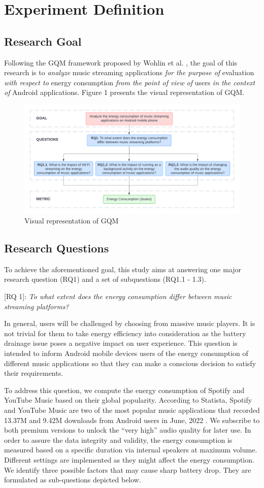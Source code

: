 \section{Experiment Definition}
\subsection{Research Goal}
Following the GQM framework proposed by Wohlin et al. \cite{wohlin2012experimentation}, the goal of this research is to \emph{analyze} music streaming applications \emph{for the purpose of} evaluation \emph{with respect to} energy consumption \emph{from the point of view of} users \emph{in the context of} Android applications. Figure 1 presents the visual representation of GQM. 
\begin{figure}[htbp]
 \centering
 \includegraphics[width=0.8\linewidth]{figures/GQM.png}\textcolor{blue}{\caption{{\color{blue}Visual representation of GQM}}}
\end{figure}
\subsection{Research Questions}
To achieve the aforementioned goal, this study aims at answering one major research question (RQ1) and a set of subquestions (RQ1.1 - 1.3).

[RQ 1]: \emph{To what extent does the energy consumption differ between music streaming platforms?}

In general, users will be challenged by choosing from massive music players. It is not trivial for them to take energy efficiency into consideration as the battery drainage issue poses a negative impact on user experience. This question is intended to inform Android mobile devices users of the energy consumption of different music applications so that they can make a conscious decision to satisfy their requirements. 

To address this question, we compute the energy consumption of Spotify and YouTube Music based on their global popularity. According to Statista, Spotify and YouTube Music are two of the most popular music applications that recorded 13.37M and 9.42M downloads from Android users in June, 2022 \cite{13}. We subscribe to both premium versions to unlock the “very high” audio quality for later use. In order to assure the data integrity and validity, the energy consumption is measured based on a specific duration via internal speakers at maximum volume. Different settings are implemented as they might affect the energy consumption. We identify three possible factors that may cause sharp battery drop. They are formulated as sub-questions depicted below.  

